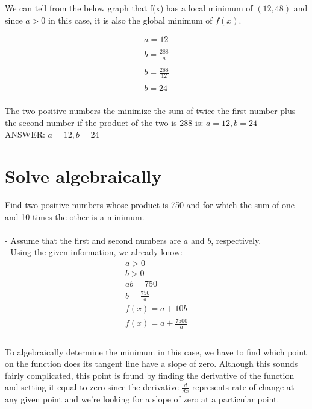 \documentclass {article}
\begin{document}
We can tell from the below graph that f(x) has a local minimum of $(12,48)$ and since $a > 0$ in this case, it is also the global minimum of $f(x)$.

\begin{align*}
a = 12 \\
\\
b = \frac{288}{a} \\
\\
b = \frac{288}{12} \\
\\
b = 24 \\
\end{align*}

The two positive numbers the minimize the sum of twice the first number plus the second number if the product of the two is 288 is: $a = 12, b = 24$\\
ANSWER: $a = 12, b = 24$

\section{Solve algebraically}
Find two positive numbers whose product is 750 and for which the sum of one and 10 times the other is a minimum.\\
\\
- Assume that the first and second numbers are $a$ and $b$, respectively.\\
- Using the given information, we already know:\\ 

\begin{align*}
	a > 0 \\
	b > 0 \\
	ab = 750 \\
	b=\frac{750}{a} \\
	f(x)= a+10b \\
	f(x)= a+\frac{7500}{a}\\
\end{align*}
\\
To algebraically determine the minimum in this case, we have to find which point on the function does its tangent line have a slope of zero. Although this sounds fairly complicated, this point is found by finding the derivative of the function and setting it equal to zero since the derivative $\frac{d}{dx}$ represents rate of change at any given point and we're looking for a slope of zero at a particular point.\\
\\
\end{document}
